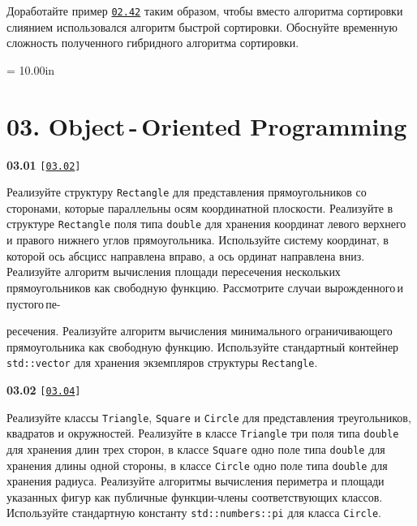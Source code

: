 \documentclass[a4paper,12pt]{article}
\begin{document}
Доработайте пример \href{https://github.com/i-s-m-mipt/Education/blob/master/projects/examples/source/02.42.cpp}{\texttt{02.42}} таким образом, чтобы вместо алгоритма сортировки слиянием использовался алгоритм быстрой сортировки. Обоснуйте временную сложность полученного гибридного алгоритма сортировки.



\newpage\thispagestyle{empty}\pdfpageheight = 10.00in\enlargethispage{100in}

\section{03. Object\,-\,Oriented Programming}

{\large \textbf{03.01} \texttt{[\href{https://github.com/i-s-m-mipt/Education/blob/master/projects/examples/source/03.02.cpp}{\texttt{03.02}}]}}

\bigskip

Реализуйте структуру \lstinline{Rectangle} для представления прямоугольников со сторонами, которые параллельны осям координатной плоскости. Реализуйте в структуре \lstinline{Rectangle} поля типа \lstinline{double} для хранения координат левого верхнего и правого нижнего углов прямоугольника. Используйте систему координат, в которой ось абсцисс направлена вправо, а ось ординат направлена вниз. Реализуйте алгоритм вычисления площади пересечения нескольких прямоугольников как свободную функцию. Рассмотрите случаи вырожденного\,и\,пустого\,пе- 

ресечения. Реализуйте алгоритм вычисления минимального ограничивающего прямоугольника как свободную функцию. Используйте стандартный контейнер \lstinline{std::vector} для хранения экземпляров структуры \lstinline{Rectangle}.

\bigskip

{\large \textbf{03.02} \texttt{[\href{https://github.com/i-s-m-mipt/Education/blob/master/projects/examples/source/03.04.cpp}{\texttt{03.04}}]}}

\bigskip

Реализуйте классы \lstinline{Triangle}, \lstinline{Square} и \lstinline{Circle} для представления треугольников, квадратов и окружностей. Реализуйте в классе \lstinline{Triangle} три поля типа \lstinline{double} для хранения длин трех сторон, в классе \lstinline{Square} одно поле типа \lstinline{double} для хранения длины одной стороны, в классе \lstinline{Circle} одно поле типа \lstinline{double} для хранения радиуса. Реализуйте алгоритмы вычисления периметра и площади указанных фигур как публичные функции-члены соответствующих классов. Используйте стандартную константу \lstinline{std::numbers::pi} для класса \lstinline{Circle}.
\end{document}
